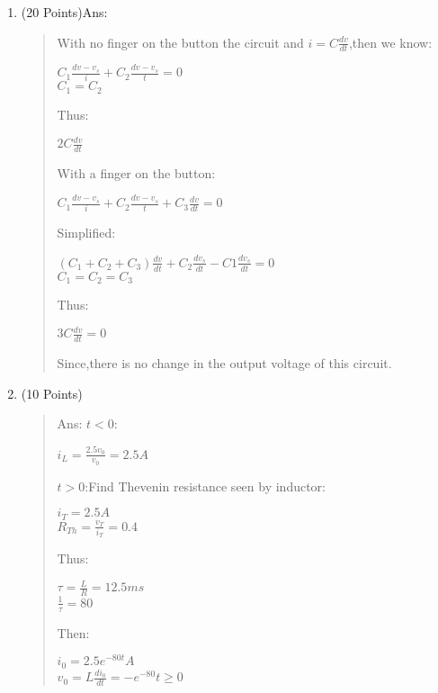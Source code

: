 \documentclass[12pt,a4paper]{article}
\begin{document}
\begin{enumerate}
		\item (20 Points)Ans:
		\begin{quote}
		With no finger on the button the circuit and $i = C\frac{dv}{dt}$,then we know:
		\begin{center}
			$C_1\frac{dv-v_s}{i}+C_2\frac{dv-v_s}{t} = 0$\\
			$C_1=C_2$
		\end{center}
		Thus:
		\begin{center}
			$2C\frac{dv}{dt}$
		\end{center}
		With a finger on the button:
		\begin{center}
			$C_1\frac{dv-v_s}{i}+C_2\frac{dv-v_s}{t}+C_3\frac{dv}{dt} = 0$
		\end{center}
		Simplified:
		\begin{center}
			$(C_1+C_2+C_3)\frac{dv}{dt}+C_2\frac{dv_s}{dt}-C1\frac{dv_s}{dt}=0$\\
			$C_1=C_2=C_3$
		\end{center}
		Thus:
		\begin{center}
			$3C\frac{dv}{dt}=0$
		\end{center}
		Since,there is no change in the output voltage of this circuit.
		\end{quote}
		\clearpage
		\item (10 Points)
		\begin{quote}
			Ans:
			$t < 0$:
			\begin{center}
				$i_L=\frac{2.5v_0}{v_0} = 2.5A$
			\end{center}
			$t > 0$:Find Thevenin resistance seen by inductor:
			\begin{center}
				$i_T = 2.5A$\\
				$R_{Th}=\frac{v_T}{i_T}=0.4$
			\end{center}
			Thus:
			\begin{center}
				$\tau = \frac{L}{R} = 12.5ms$\\
				$\frac{1}{\tau} = 80$
			\end{center}
			Then:
			\begin{center}
				$i_0 = 2.5e^{-80t}A$\\
				$v_0 = L\frac{di_0}{dt} = -e^{-80}$\qquad $t\ge0$
			\end{center}
		\end{quote}
		

\end{enumerate}
\end{document}
